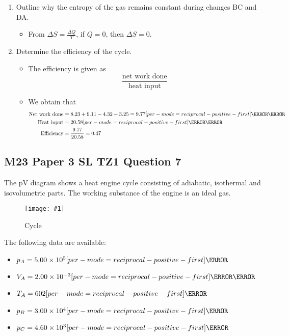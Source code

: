 \documentclass[a4paper,12pt]{article}
\let\oldsi\si
\renewcommand{\si}[1]{\oldsi[per-mode=reciprocal-positive-first]{#1}}
\newcommand{\img}[4]{\begin{center}
  \begin{figure}[H]
    \centering
    \texttt{[image: \#1]}
    \caption{#3}
    \label{fig:#4}
  \end{figure}
\end{center}}
\begin{document}
\begin{enumerate}[label=(\alph*)]
  \item Outline why the entropy of the gas remains constant during changes BC and DA.
        \begin{itemize}
          \item From $\Delta S = \frac{\Delta Q}{T}$, if $Q = 0$, then $\Delta S = 0$.
        \end{itemize}
  \item Determine the efficiency of the cycle.
        \begin{itemize}
          \item The efficiency is given as $$\frac{\text{net work done}}{\text{heat input}}$$
          \item We obtain that
                \begin{align*}
                  \text{Net work done} & = 8.23 + 9.11 - 4.32 - 3.25 = 9.77\si{\kilo\joule} \\
                  \text{Heat input}    & = 20.58 \si{\kilo\joule}                           \\
                  \text{Efficiency}    & = \frac{9.77}{20.58} = 0.47
                \end{align*}
        \end{itemize}
\end{enumerate}


\pagebreak

\subsection{M23 Paper 3 SL TZ1 Question 7}

The pV diagram shows a heat engine cycle consisting of adiabatic, isothermal and isovolumetric parts. The working substance of the engine is an ideal gas.

\img{ex/7.png}{0.5}{Cycle}{ex7}

The following data are available:
\begin{itemize}[label={}]
  \item $p_A = 5.00 \times 10^5 \si{\pascal}$
  \item $V_A = 2.00 \times 10^{-3} \si{\metre\cubed}$
  \item $T_A = 602 \si{\kelvin}$
  \item $p_B = 3.00 \times 10^4 \si{\pascal}$
  \item $p_C = 4.60 \times 10^3 \si{\pascal}$
\end{itemize}
\end{document}

